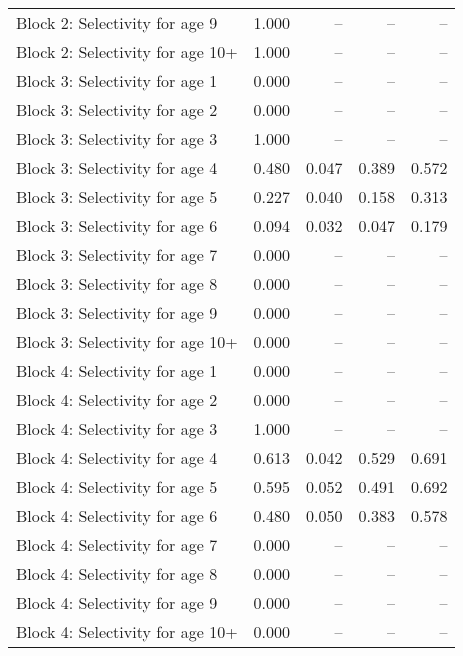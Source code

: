 \documentclass[
]{article}
\begin{document}
\begin{landscape}
\begin{longtable}[t]{lrrrr}
Block 2: Selectivity for age 9 & 1.000 & -- & -- & --\\
Block 2: Selectivity for age 10+ & 1.000 & -- & -- & --\\
Block 3: Selectivity for age 1 & 0.000 & -- & -- & --\\
Block 3: Selectivity for age 2 & 0.000 & -- & -- & --\\
\addlinespace
Block 3: Selectivity for age 3 & 1.000 & -- & -- & --\\
Block 3: Selectivity for age 4 & 0.480 & 0.047 & 0.389 & 0.572\\
Block 3: Selectivity for age 5 & 0.227 & 0.040 & 0.158 & 0.313\\
Block 3: Selectivity for age 6 & 0.094 & 0.032 & 0.047 & 0.179\\
Block 3: Selectivity for age 7 & 0.000 & -- & -- & --\\
\addlinespace
Block 3: Selectivity for age 8 & 0.000 & -- & -- & --\\
Block 3: Selectivity for age 9 & 0.000 & -- & -- & --\\
Block 3: Selectivity for age 10+ & 0.000 & -- & -- & --\\
Block 4: Selectivity for age 1 & 0.000 & -- & -- & --\\
Block 4: Selectivity for age 2 & 0.000 & -- & -- & --\\
\addlinespace
Block 4: Selectivity for age 3 & 1.000 & -- & -- & --\\
Block 4: Selectivity for age 4 & 0.613 & 0.042 & 0.529 & 0.691\\
Block 4: Selectivity for age 5 & 0.595 & 0.052 & 0.491 & 0.692\\
Block 4: Selectivity for age 6 & 0.480 & 0.050 & 0.383 & 0.578\\
Block 4: Selectivity for age 7 & 0.000 & -- & -- & --\\
\addlinespace
Block 4: Selectivity for age 8 & 0.000 & -- & -- & --\\
Block 4: Selectivity for age 9 & 0.000 & -- & -- & --\\
Block 4: Selectivity for age 10+ & 0.000 & -- & -- & --\\*
\end{longtable}
\end{landscape}
\end{document}
